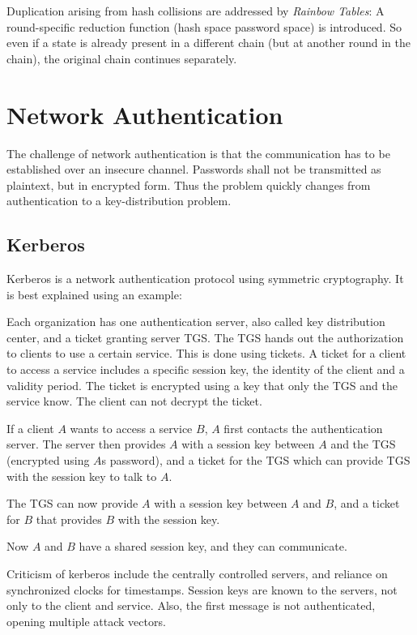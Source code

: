 Duplication arising from hash collisions are addressed by \emph{Rainbow Tables}:
A round-specific reduction function (hash space \textrightarrow password space)
is introduced. So even if a state is already present in a different chain (but
at another round in the chain), the original chain continues separately.

\section{Network Authentication}
The challenge of network authentication is that the communication has to be
established over an insecure channel. Passwords shall not be transmitted as
plaintext, but in encrypted form. Thus the problem quickly changes from
authentication to a key-distribution problem.

\subsection{Kerberos}
Kerberos is a network authentication protocol using symmetric cryptography. It
is best explained using an example:

Each organization has one authentication server, also called key distribution
center, and a ticket granting server TGS. The TGS hands out the authorization to
clients to use a certain service. This is done using tickets. A ticket for a
client to access a service includes a specific session key, the identity of the
client and a validity period. The ticket is encrypted using a key that only the
TGS and the service know. The client can not decrypt the ticket.

If a client $A$ wants to access a service $B$, $A$ first contacts the
authentication server. The server then provides $A$ with a session key between
$A$ and the TGS (encrypted using $A$s password), and a ticket for the TGS which
can provide TGS with the session key to talk to $A$.

The TGS can now provide $A$ with a session key between $A$ and $B$, and a ticket
for $B$ that provides $B$ with the session key.

Now $A$ and $B$ have a shared session key, and they can communicate.

Criticism of kerberos include the centrally controlled servers, and reliance on
synchronized clocks for timestamps. Session keys are known to the servers, not
only to the client and service. Also, the first message is not authenticated,
opening multiple attack vectors.


